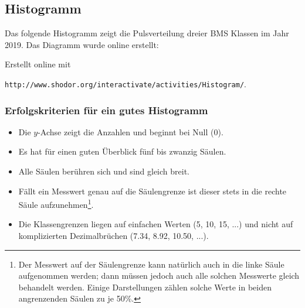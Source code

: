 
\newpage



\subsection{Histogramm}

Das folgende Histogramm zeigt die Pulsverteilung dreier BMS Klassen im Jahr 2019. Das Diagramm wurde online erstellt:


Erstellt online mit

\texttt{http://www.shodor.org/interactivate/activities/Histogram/}.


\subsubsection{Erfolgskriterien für ein gutes Histogramm}
\begin{itemize}
\item Die $y$-Achse zeigt die Anzahlen und beginnt bei Null (0).
\item Es hat für einen guten Überblick fünf bis zwanzig Säulen.
\item Alle Säulen berühren sich und sind gleich breit.
\item Fällt ein Messwert genau auf die Säulengrenze ist dieser stets
  in die rechte Säule aufzunehmen\footnote{Der Messwert auf der
    Säulengrenze kann natürlich auch in die linke Säule aufgenommen
    werden; dann müssen jedoch auch alle solchen Messwerte gleich
    behandelt werden. Einige Darstellungen zählen solche Werte in beiden angrenzenden Säulen zu je 50\%.}.
\item Die Klassengrenzen liegen auf einfachen Werten (5, 10, 15, ...)
  und nicht auf komplizierten Dezimalbrüchen (7.34, 8.92, 10.50, ...).
\end{itemize}
\newpage


